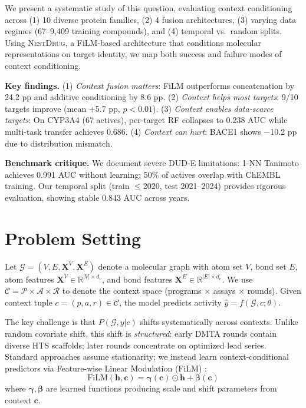 \documentclass{article}
\newcommand{\methodname}{\textsc{NestDrug}}
\newcommand{\film}{\text{FiLM}}
\begin{document}
We present a systematic study of this question, evaluating context conditioning across (1) 10 diverse protein families, (2) 4 fusion architectures, (3) varying data regimes (67--9,409 training compounds), and (4) temporal vs.\ random splits. Using \methodname{}, a FiLM-based architecture \citep{perez_2018_film} that conditions molecular representations on target identity, we map both success and failure modes of context conditioning.

\textbf{Key findings.} (1) \textit{Context fusion matters}: FiLM outperforms concatenation by 24.2 pp and additive conditioning by 8.6 pp. (2) \textit{Context helps most targets}: 9/10 targets improve (mean +5.7 pp, $p < 0.01$). (3) \textit{Context enables data-scarce targets}: On CYP3A4 (67 actives), per-target RF collapses to 0.238 AUC while multi-task transfer achieves 0.686. (4) \textit{Context can hurt}: BACE1 shows $-$10.2 pp due to distribution mismatch.

\textbf{Benchmark critique.} We document severe DUD-E limitations: 1-NN Tanimoto achieves 0.991 AUC without learning; 50\% of actives overlap with ChEMBL training. Our temporal split (train $\leq$2020, test 2021--2024) provides rigorous evaluation, showing stable 0.843 AUC across years.

\section{Problem Setting}
\label{sec:problem}

Let $\mathcal{G} = (V, E, \mathbf{X}^V, \mathbf{X}^E)$ denote a molecular graph with atom set $V$, bond set $E$, atom features $\mathbf{X}^V \in \mathbb{R}^{|V| \times d_v}$, and bond features $\mathbf{X}^E \in \mathbb{R}^{|E| \times d_e}$. We use $\mathcal{C} = \mathcal{P} \times \mathcal{A} \times \mathcal{R}$ to denote the context space (programs $\times$ assays $\times$ rounds). Given context tuple $c = (p, a, r) \in \mathcal{C}$, the model predicts activity $\hat{y} = f(\mathcal{G}, c; \theta)$.

The key challenge is that $P(\mathcal{G}, y | c)$ shifts systematically across contexts. Unlike random covariate shift, this shift is \textit{structured}: early DMTA rounds contain diverse HTS scaffolds; later rounds concentrate on optimized lead series. Standard approaches assume stationarity; we instead learn context-conditional predictors via Feature-wise Linear Modulation (FiLM) \citep{perez_2018_film}:
\begin{equation}
    \film(\mathbf{h}, \mathbf{c}) = \boldsymbol{\gamma}(\mathbf{c}) \odot \mathbf{h} + \boldsymbol{\beta}(\mathbf{c})
\end{equation}
where $\boldsymbol{\gamma}, \boldsymbol{\beta}$ are learned functions producing scale and shift parameters from context $\mathbf{c}$.
\end{document}
